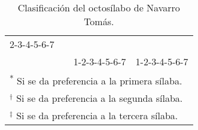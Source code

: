 \begin{table}[h!]
\begin{tabular}{llll}
                2-3-4-5-6-7&&&\\
                &&1-2-3-4-5-6-7&1-2-3-4-5-6-7\\
		\bottomrule
		\multicolumn{4}{l}{\footnotesize\textsuperscript{*} Si se da preferencia a la primera sílaba.}\\
		\multicolumn{4}{l}{\footnotesize$^\dag$ Si se da preferencia a la segunda sílaba.}\\
		\multicolumn{4}{l}{\footnotesize$^\ddag$ Si se da preferencia a la tercera sílaba.}\\
	\end{tabular}
	\caption{Clasificación del octosílabo de Navarro Tomás.}
	\label{tab:octosilabos}
\end{table}

